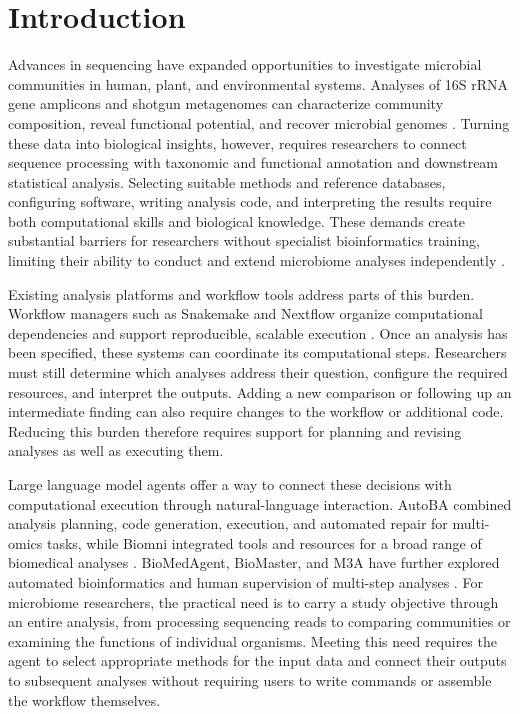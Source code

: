 \documentclass[10pt,letterpaper]{article}
\begin{document}
\section{Introduction}
\label{sec:intro}

Advances in sequencing have expanded opportunities to investigate microbial
communities in human, plant, and environmental systems.  Analyses of 16S
rRNA gene amplicons and shotgun metagenomes can characterize community
composition, reveal functional potential, and recover microbial genomes
\parencite{knight2018bestpractices}.  Turning these data into biological
insights, however, requires researchers to connect sequence processing with
taxonomic and functional annotation and downstream statistical analysis.
Selecting suitable methods and reference databases, configuring software,
writing analysis code, and interpreting the results require both computational
skills and biological knowledge.  These demands create substantial barriers
for researchers without specialist bioinformatics training, limiting their
ability to conduct and extend microbiome analyses independently
\parencite{tong2020genepiper,liu2021practical}.

Existing analysis platforms and workflow tools address parts of this burden.
Workflow managers such as Snakemake and Nextflow organize computational
dependencies and support reproducible, scalable execution
\parencite{koster2012snakemake,ditommaso2017nextflow}.  Once an analysis has
been specified, these systems can coordinate its computational steps.
Researchers must still determine which analyses address their question,
configure the required resources, and interpret the outputs.  Adding a new
comparison or following up an intermediate finding can also require changes
to the workflow or additional code.  Reducing this burden therefore requires
support for planning and revising analyses as well as executing them.

Large language model agents offer a way to connect these decisions with
computational execution through natural-language interaction.  AutoBA
combined analysis planning, code generation, execution, and automated repair
for multi-omics tasks, while Biomni integrated tools and resources for a broad
range of biomedical analyses \parencite{zhou2024autoba,huang2026biomni}.
BioMedAgent, BioMaster, and M3A have further explored automated bioinformatics
and human supervision of multi-step analyses
\parencite{bu2026biomedagent,su2026biomaster,johri2026m3a}.
For microbiome researchers, the practical need is to carry a study objective
through an entire analysis, from processing sequencing reads to comparing
communities or examining the functions of individual organisms.  Meeting
this need requires the agent to select appropriate methods for the input
data and connect their outputs to subsequent analyses without requiring
users to write commands or assemble the workflow themselves.
\end{document}
